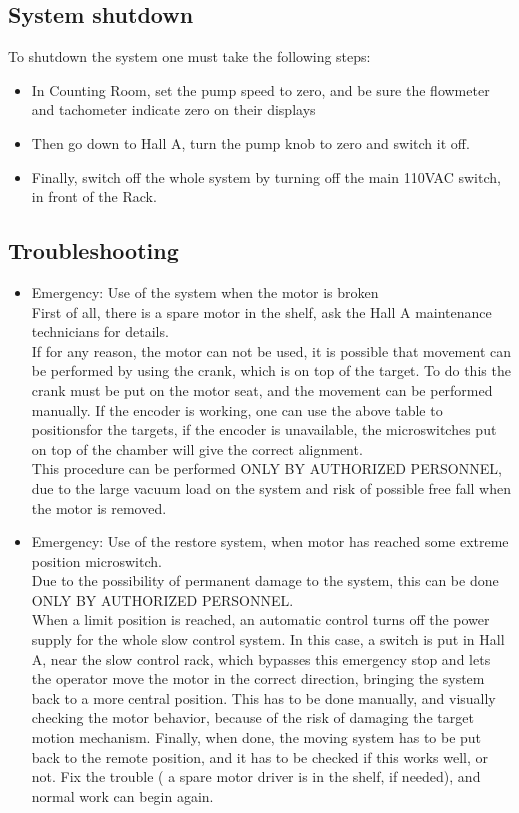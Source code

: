 \subsection{System shutdown}

To shutdown the system one must take the following steps: 

\begin{itemize}
\item In Counting Room, set the pump speed to zero, and be sure the flowmeter
and tachometer indicate zero on their displays
\item Then go down to Hall A, turn the pump knob to zero and switch it off.
\item Finally, switch off the whole system by turning off the main 110VAC
switch, in front of the Rack.
\end{itemize}

\subsection{Troubleshooting}

\begin{itemize}
\item Emergency: Use of the system when the motor is broken \\
First of all, there is a spare motor in the shelf, ask the Hall A
maintenance technicians for details. \\
If for any reason, the motor can not be used, it is possible that
movement can be performed by using the crank, which is on top of the
target. To do this the crank must be put on the motor seat, and the
movement can be performed manually. If the encoder is working, one
can use the above table to positionsfor the targets, if the encoder
is unavailable, the microswitches put on top of the chamber will give
the correct alignment. \\
This procedure can be performed ONLY BY AUTHORIZED PERSONNEL, due
to the large vacuum load on the system and risk of possible free fall
when the motor is removed.
\item Emergency: Use of the restore system, when motor has reached some
extreme position microswitch. \\
Due to the possibility of permanent damage to the system, this can
be done ONLY BY AUTHORIZED PERSONNEL. \\
When a limit position is reached, an automatic control turns off the
power supply for the whole slow control system. In this case, a switch
is put in Hall A, near the slow control rack, which bypasses this
emergency stop and lets the operator move the motor in the correct
direction, bringing the system back to a more central position. This
has to be done manually, and visually checking the motor behavior,
because of the risk of damaging the target motion mechanism. Finally,
when done, the moving system has to be put back to the remote position,
and it has to be checked if this works well, or not. Fix the trouble
( a spare motor driver is in the shelf, if needed), and normal work
can begin again.
\end{itemize}

